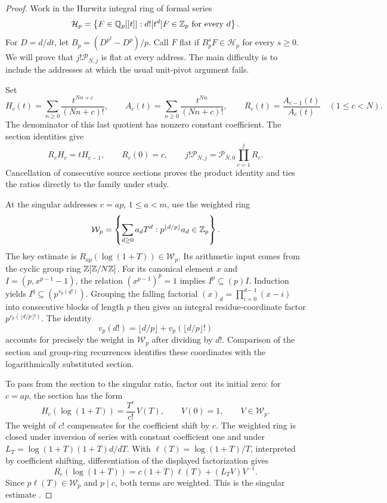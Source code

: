 \begin{proof}
Work in the Hurwitz integral ring of formal series
\[
 \mathcal H_p=\left\{F\in\mathbb Q_p[[t]]:
            d![t^d]F\in\mathbb Z_p\text{ for every }d\right\}.
\]
For $D=d/dt$, let $B_p=(D^{p^2}-D^p)/p$.  Call $F$ flat if
$B_p^sF\in\mathcal H_p$ for every $s\ge0$.
We will prove that $j!\mathcal P_{N,j}$ is flat at every address.  The main
difficulty is to include the addresses at which the usual unit-pivot
argument fails.

Set
\[
 H_c(t)=\sum_{n\ge0}\frac{t^{Nn+c}}{(Nn+c)!},\qquad
 A_c(t)=\sum_{n\ge0}\frac{t^{Nn}}{(Nn+c)!},\qquad
 R_c(t)=\frac{A_{c-1}(t)}{A_c(t)}\quad(1\le c<N).
\]
The denominator of this last quotient has nonzero constant coefficient.
The section identities give
\[
 R_cH_c=tH_{c-1},\qquad R_c(0)=c,\qquad
 j!\mathcal P_{N,j}=\mathcal P_{N,0}\prod_{c=1}^{j}R_c.
\]
Cancellation of consecutive source sections proves the product identity
and ties the ratios directly to the family under study.

At the singular addresses $c=ap$, $1\le a<m$, use the weighted ring
\[
 \mathcal W_p=\left\{\sum_{d\ge0}a_dT^d:
          p^{\lfloor d/p\rfloor}a_d\in\mathbb Z_p\right\}.
\]
The key estimate is $R_{ap}(\log(1+T))\in\mathcal W_p$.  Its arithmetic
input comes from the cyclic group ring $\mathbb Z[\mathbb Z/N\mathbb Z]$.
For its canonical element $x$ and $I=(p,x^{p-1}-1)$, the relation
$(x^{p-1})^p=1$ implies $I^p\subseteq(p)I$.  Induction yields
$I^q\subseteq(p^{v_p(q!)})$.  Grouping the falling factorial
$(x)_d=\prod_{i=0}^{d-1}(x-i)$ into consecutive blocks of length $p$
then gives an integral residue-coordinate factor
$p^{v_p(\lfloor d/p\rfloor!)}$.  The identity
\[
 v_p(d!)=\lfloor d/p\rfloor+v_p(\lfloor d/p\rfloor!)
\]
accounts for precisely the weight in $\mathcal W_p$ after dividing by $d!$.
Comparison of the section and group-ring recurrences identifies these
coordinates with the logarithmically substituted section.

To pass from the section to the singular ratio, factor out its initial zero:
for $c=ap$, the section has the form
\[
 H_c(\log(1+T))=\frac{T^c}{c!}\,V(T),\qquad V(0)=1,
 \qquad V\in\mathcal W_p.
\]
The weight of $c!$ compensates for the coefficient shift by $c$.
The weighted ring is closed under inversion of series with constant
coefficient one and under $L_T=\log(1+T)(1+T)d/dT$.  With
$\ell(T)=\log(1+T)/T$, interpreted by coefficient shifting, differentiation
of the displayed factorization gives
\[
 R_c(\log(1+T))=c(1+T)\ell(T)+(L_TV)V^{-1}.
\]
Since $p\ell(T)\in\mathcal W_p$ and $p\mid c$, both terms are weighted.
This is the singular estimate
.


\end{proof}
